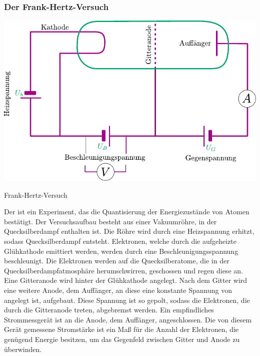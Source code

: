\documentclass{tuftebook}
\begin{document}
    \subsubsection{Der Frank-Hertz-Versuch}
    \begin{marginfigure}
        \centering
        \includegraphics[width=\linewidth]{figures/frankhertzaufbau.pdf}
        \caption{Frank-Hertz-Versuch}
        \label{fig:frankhertzaufbau}
    \end{marginfigure}
    Der  ist ein Experiment, das die Quantisierung der Energiezustände von Atomen bestätigt. Der Versuchsaufbau besteht aus einer Vakuumröhre, in der Quecksilberdampf enthalten ist. Die Röhre wird durch eine Heizspannung erhitzt, sodass Quecksilberdampf entsteht. Elektronen, welche durch die aufgeheizte Glühkathode emittiert werden, werden durch eine Beschleunigungsspannung  beschleunigt. Die Elektronen werden auf die Quecksilberatome, die in der Quecksilberdampfatmosphäre herumschwirren, geschossen und regen diese an. Eine Gitteranode wird hinter der Glühkathode angelegt. 
    Nach dem Gitter wird eine weitere Anode, dem Auffänger, an diese eine konstante Spannung von  angelegt ist, aufgebaut. Diese Spannung ist so gepolt, sodass die Elektronen, die durch die Gitteranode treten, abgebremst werden. Ein empfindliches Strommessgerät ist an die Anode, dem Auffänger, angeschlossen. Die von diesem Gerät gemessene Stromstärke ist ein Maß für die Anzahl der Elektronen, die genügend Energie besitzen, um das Gegenfeld zwischen Gitter und Anode zu überwinden.
\end{document}
